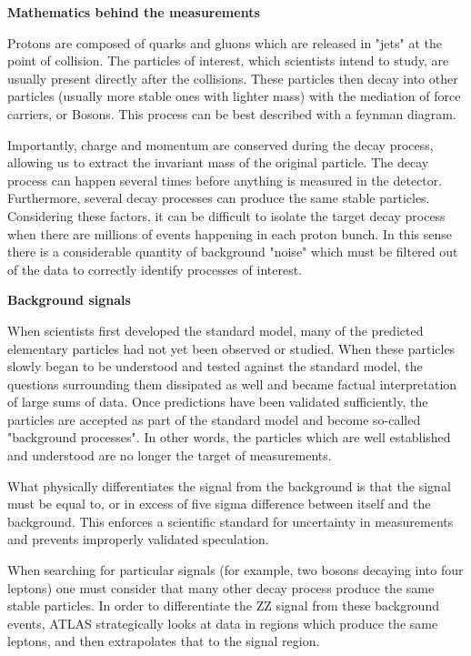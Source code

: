 \documentclass[runningheads,a4paper]{llncs}
\begin{document}
\textbf{Mathematics behind the measurements}


Protons are composed of quarks and gluons which are released in "jets" at the point of collision. The particles of interest, which scientists intend to study, are usually present directly after the collisions. These particles then decay into other particles (usually more stable ones with lighter mass) with the mediation of force carriers, or Bosons. This process can be best described with a feynman diagram.

Importantly, charge and momentum are conserved during the decay process, allowing us to extract the invariant mass of the original particle. The decay process can happen several times before anything is measured in the detector. Furthermore, several decay processes can produce the same stable particles. Considering these factors, it can be difficult to isolate the target decay process when there are millions of events happening in each proton bunch. In this sense there is a considerable quantity of background "noise" which must be filtered out of the data to correctly identify processes of interest.

\textbf{Background signals}

When scientists first developed the standard model, many of the predicted elementary particles had not yet been observed or studied. When these particles slowly began to be understood and tested against the standard model, the questions surrounding them dissipated as well and became factual interpretation of large sums of data. Once predictions have been validated sufficiently, the particles are accepted as part of the standard model and become so-called "background processes". In other words, the particles which are well established and understood are no longer the target of measurements.

What physically differentiates the signal from the background is that the signal must be equal to, or in excess of five sigma difference between itself and the background. This enforces a scientific standard for uncertainty in measurements and prevents improperly validated speculation.

When searching for particular signals (for example, two bosons decaying into four leptons) one must consider that many other decay process produce the same stable particles. In order to differentiate the ZZ signal from these background events, ATLAS strategically looks at data in regions which produce the same leptons, and then extrapolates that to the signal region. 
\end{document}
